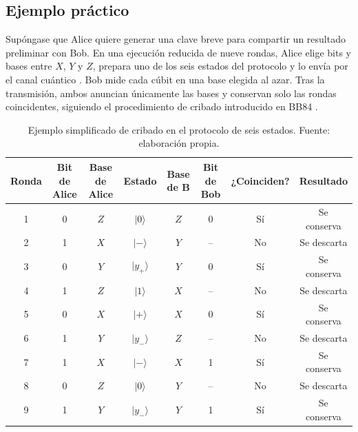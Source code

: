 \subsection{Ejemplo práctico}

Supóngase que Alice quiere generar una clave breve para compartir un resultado preliminar con Bob. En una ejecución reducida de nueve rondas, Alice elige bits y bases entre $X$, $Y$ y $Z$, prepara uno de los seis estados del protocolo y lo envía por el canal cuántico \citep{bruss1998}. Bob mide cada cúbit en una base elegida al azar. Tras la transmisión, ambos anuncian únicamente las bases y conservan solo las rondas coincidentes, siguiendo el procedimiento de cribado introducido en BB84 \citep{bennett1984}.

\begin{table}[h]
    \centering
    \scriptsize
    \begin{tabular}{c c c c c c c c}
        \hline\hline
        Ronda & Bit de Alice & Base de Alice & Estado & Base de B & Bit de Bob & ¿Coinciden? & Resultado \\
        \hline
        1 & 0 & $Z$ & $|0\rangle$ & $Z$ & 0 & Sí & Se conserva \\
        2 & 1 & $X$ & $|-\rangle$ & $Y$ & -- & No & Se descarta \\
        3 & 0 & $Y$ & $|y_+\rangle$ & $Y$ & 0 & Sí & Se conserva \\
        4 & 1 & $Z$ & $|1\rangle$ & $X$ & -- & No & Se descarta \\
        5 & 0 & $X$ & $|+\rangle$ & $X$ & 0 & Sí & Se conserva \\
        6 & 1 & $Y$ & $|y_-\rangle$ & $Z$ & -- & No & Se descarta \\
        7 & 1 & $X$ & $|-\rangle$ & $X$ & 1 & Sí & Se conserva \\
        8 & 0 & $Z$ & $|0\rangle$ & $Y$ & -- & No & Se descarta \\
        9 & 1 & $Y$ & $|y_-\rangle$ & $Y$ & 1 & Sí & Se conserva \\
        \hline
    \end{tabular}
    \caption[Ejemplo de cribado en el protocolo de seis estados]{Ejemplo simplificado de cribado en el protocolo de seis estados. Fuente: elaboración propia.}
    \label{tab:seis_estados_ejemplo}
\end{table}

